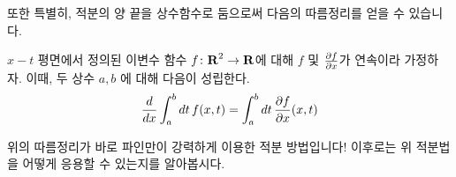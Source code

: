\documentclass[11pt]{book}
\begin{document}
\begin{MLPar}
또한 특별히, 적분의 양 끝을 상수함수로 둠으로써 다음의 따름정리를 얻을 수 있습니다.
\end{MLPar}

\begin{MLCor}
$x-t$ 평면에서 정의된 이변수 함수 $f \colon \mbox{$\mathbf R$}^2 \to \mbox{$\mathbf R$}$에 대해 $f$ 및 $\pdv{f}{x}$가 연속이라 가정하자.
이때, 두 상수 $a, b$ 에 대해 다음이 성립한다.
\[\dv{x}\int_{a}^{b}\dd{t} f(x, t) = \int_{a}^{b} \dd{t} \pdv{f}{x} \pqty{x, t}\]
\end{MLCor}

\begin{MLPar}
위의 따름정리가 바로 파인만이 강력하게 이용한 적분 방법입니다!
이후로는 위 적분법을 어떻게 응용할 수 있는지를 알아봅시다.
\end{MLPar}
\end{document}
